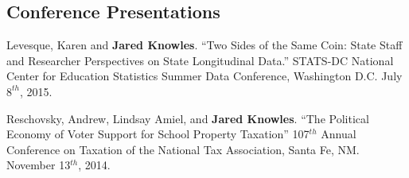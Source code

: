 \documentclass[margin,line]{res}
\newenvironment{list2}{
  \begin{list}{$\bullet$}{%
      \setlength{\itemsep}{0in}
      \setlength{\parsep}{0in} \setlength{\parskip}{0in}
      \setlength{\topsep}{0in} \setlength{\partopsep}{0in} 
      \setlength{\leftmargin}{0.2in}}}{\end{list}}
\begin{document}
\begin{resume}
% 
% 
% 
% 
% 
% 

\vspace*{5mm}


\section{\sc Conference Presentations}

Levesque, Karen and \textbf{Jared Knowles}. ``Two Sides of the Same Coin: State 
Staff and Researcher Perspectives on State Longitudinal Data.'' STATS-DC National Center for Education Statistics Summer Data Conference, Washington D.C. July $8^{th}$, 2015.

Reschovsky, Andrew, Lindsay Amiel, and \textbf{Jared Knowles}. ``The Political Economy of Voter Support for School Property Taxation'' 107$^{th}$ Annual Conference on Taxation of the National Tax Association, Santa Fe, NM. November 13$^{th}$, 2014. 


\end{resume}
\end{document}
